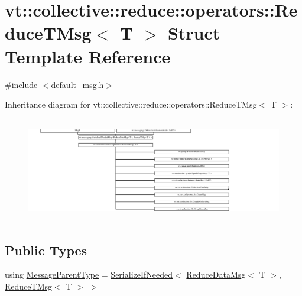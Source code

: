 \hypertarget{structvt_1_1collective_1_1reduce_1_1operators_1_1_reduce_t_msg}{}\section{vt\+:\+:collective\+:\+:reduce\+:\+:operators\+:\+:Reduce\+T\+Msg$<$ T $>$ Struct Template Reference}
\label{structvt_1_1collective_1_1reduce_1_1operators_1_1_reduce_t_msg}


{\ttfamily \#include $<$default\+\_\+msg.\+h$>$}

Inheritance diagram for vt\+:\+:collective\+:\+:reduce\+:\+:operators\+:\+:Reduce\+T\+Msg$<$ T $>$\+:\begin{figure}[H]
\begin{center}
\leavevmode
\includegraphics[height=4.599589cm]{structvt_1_1collective_1_1reduce_1_1operators_1_1_reduce_t_msg}
\end{center}
\end{figure}
\subsection*{Public Types}
\begin{DoxyCompactItemize}
\item 
using \hyperlink{structvt_1_1collective_1_1reduce_1_1operators_1_1_reduce_t_msg_a0dd12197060e03bb7e73dbe299044f22}{Message\+Parent\+Type} = \hyperlink{namespacevt_a0a4ad8c256fcffa564e9fa7800e4b495}{Serialize\+If\+Needed}$<$ \hyperlink{structvt_1_1collective_1_1reduce_1_1operators_1_1_reduce_data_msg}{Reduce\+Data\+Msg}$<$ T $>$, \hyperlink{structvt_1_1collective_1_1reduce_1_1operators_1_1_reduce_t_msg}{Reduce\+T\+Msg}$<$ T $>$ $>$
\end{DoxyCompactItemize}
